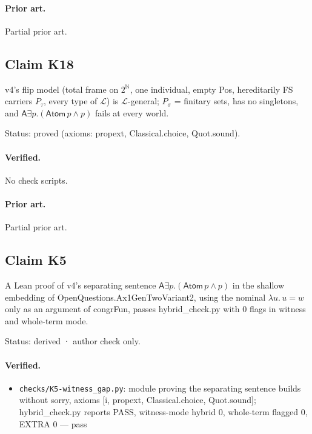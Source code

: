 \documentclass{article}
\begin{document}
\paragraph{Prior art.} Partial prior art.

\subsection*{Claim K18}

v4's flip model (total frame on $2^{\mathbb N}$, one individual, empty Pos, hereditarily FS carriers $P_\tau$, every type of $\mathcal L$) is $\mathcal L$-general; $P_\sigma$ = finitary sets, has no singletons, and $\mathsf A\exists p.(\mathsf{Atom}\,p\wedge p)$ fails at every world.

Status: proved (axioms: propext, Classical.choice, Quot.sound).

\paragraph{Verified.}
No check scripts.

\paragraph{Prior art.} Partial prior art.

\subsection*{Claim K5}

A Lean proof of v4's separating sentence $\mathsf A\exists p.(\mathsf{Atom}\,p\wedge p)$ in the shallow embedding of OpenQuestions.Ax1GenTwoVariant2, using the nominal $\lambda u.\,u=w$ only as an argument of congrFun, passes hybrid\_check.py with 0 flags in witness and whole-term mode.

Status: derived · author check only.

\paragraph{Verified.}
\begin{itemize}
\item \texttt{checks/K5-witness\_gap.py}: module proving the separating sentence builds without sorry, axioms [i, propext, Classical.choice, Quot.sound]; hybrid\_check.py reports PASS, witness-mode hybrid 0, whole-term flagged 0, EXTRA 0 --- pass
\end{itemize}
\end{document}
